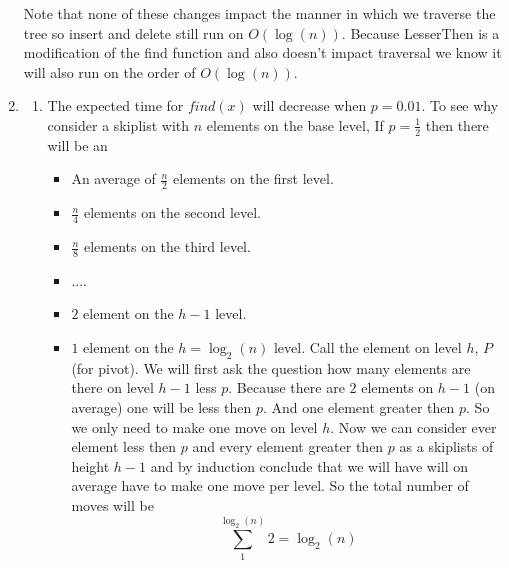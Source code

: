 \documentclass[11pt]{article}
\begin{document}
\begin{enumerate}
		Note that none of these changes impact the manner in which we
		traverse the tree so insert and delete still run on
		$O(\log(n))$.
		Because LesserThen is a modification of the find function and
		also doesn't impact traversal we know it will also run on the
		order of $O(\log(n))$.
	\item 

	\begin{enumerate}
		\item 
		The expected time for $\textit{find}(x)$ will decrease when
		$p=0.01$. To see why consider a skiplist with $n$ elements on
		the base level, If $p = \frac{1}{2}$ then there will be an
		\begin{itemize}
		\item An average of $\frac{n}{2}$ elements on the first level.
		\item $\frac{n}{4}$ elements on the second level.
		\item $\frac{n}{8}$ elements on the third level.
		\item ....
		\item $2$ element on the $h - 1 $ level.
		\item $1$ element on the $h =\log_2(n)$ level.
			Call the element on level $h$, $P$ (for pivot).
			We will first ask the question how many elements are
				there on level $h-1$ less $p$.
				Because there are $2$ elements on
				$h-1$ (on average) one will
				be less then $p$. And one element greater
				then $p$. So we only need to make one move on
				level $h$.
				Now we can consider ever element less then $p$
				and every element greater then $p$
				as a skiplists of height $h-1$ and by induction
				conclude that we will have will on average have
				to make one move per level.
			So the total number of moves will be
				$$\sum_1^{\log_2(n)}2 = \log_2(n)$$
			

\end{itemize}
\end{enumerate}
\end{enumerate}
\end{document}
